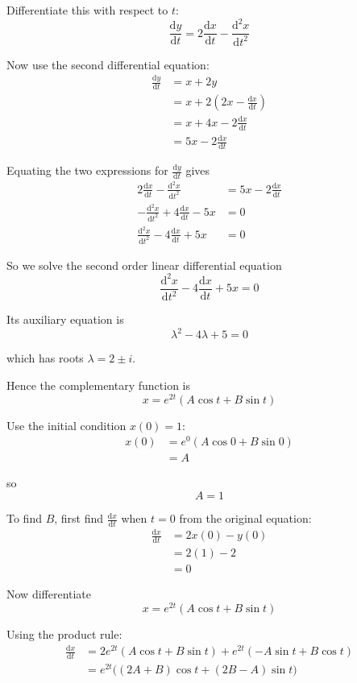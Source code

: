 \documentclass[leqno]{article}
\begin{document}
\begin{enumerate}[
  label=\textbf{\arabic*.},
  leftmargin=*,
  topsep=0pt,
  partopsep=0pt,
  parsep=0pt
]
\begin{djsSolution}
Differentiate this with respect to \(t\):
\[
\frac{\mathrm{d}y}{\mathrm{d}t}=2\frac{\mathrm{d}x}{\mathrm{d}t}-\frac{\mathrm{d}^2x}{\mathrm{d}t^2}
\]

Now use the second differential equation:
\begin{align*}
\frac{\mathrm{d}y}{\mathrm{d}t}
&=x+2y\\
&=x+2\left(2x-\frac{\mathrm{d}x}{\mathrm{d}t}\right)\\
&=x+4x-2\frac{\mathrm{d}x}{\mathrm{d}t}\\
&=5x-2\frac{\mathrm{d}x}{\mathrm{d}t}
\end{align*}

Equating the two expressions for \(\frac{\mathrm{d}y}{\mathrm{d}t}\) gives
\begin{align*}
2\frac{\mathrm{d}x}{\mathrm{d}t}-\frac{\mathrm{d}^2x}{\mathrm{d}t^2}
&=5x-2\frac{\mathrm{d}x}{\mathrm{d}t}\\
-\frac{\mathrm{d}^2x}{\mathrm{d}t^2}+4\frac{\mathrm{d}x}{\mathrm{d}t}-5x&=0\\
\frac{\mathrm{d}^2x}{\mathrm{d}t^2}-4\frac{\mathrm{d}x}{\mathrm{d}t}+5x&=0
\end{align*}

So we solve the second order linear differential equation
\[
\frac{\mathrm{d}^2x}{\mathrm{d}t^2}-4\frac{\mathrm{d}x}{\mathrm{d}t}+5x=0
\]

Its auxiliary equation is
\[
\lambda^2-4\lambda+5=0
\]

which has roots \(\lambda=2\pm i\).

Hence the complementary function is
\[
x=e^{2t}(A\cos t+B\sin t)
\]

Use the initial condition \(x(0)=1\):
\begin{align*}
x(0)&=e^0(A\cos 0+B\sin 0)\\
&=A
\end{align*}

so
\[
A=1
\]

To find \(B\), first find \(\frac{\mathrm{d}x}{\mathrm{d}t}\) when \(t=0\) from the original equation:
\begin{align*}
\frac{\mathrm{d}x}{\mathrm{d}t}
&=2x(0)-y(0)\\
&=2(1)-2\\
&=0
\end{align*}

Now differentiate
\[
x=e^{2t}(A\cos t+B\sin t)
\]

Using the product rule:
\begin{align*}
\frac{\mathrm{d}x}{\mathrm{d}t}
&=2e^{2t}(A\cos t+B\sin t)+e^{2t}(-A\sin t+B\cos t)\\
&=e^{2t}\bigl((2A+B)\cos t+(2B-A)\sin t\bigr)
\end{align*}


\end{djsSolution}
\end{enumerate}
\end{document}
